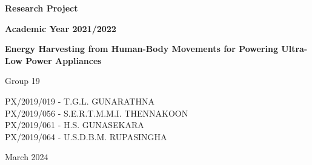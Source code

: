 \documentclass[11pt]{report}	%
\begin{document}
\begin{titlepage}
\LARGE\textbf{Research Project} \\	%

\vspace{0.5cm} 

\large\textbf{Academic Year 2021/2022} 	



\vspace{0.5 cm}	 %
					
\huge\textbf{Energy Harvesting from Human-Body Movements for Powering Ultra-Low Power Appliances} 	%

\vspace{0.5 cm}	%


\vspace{1 cm}
\large{Group 19} %
\vspace{1 cm}	%


\large{
	PX/2019/019 - T.G.L. GUNARATHNA\\[0.15cm] %
	PX/2019/056 - S.E.R.T.M.M.I. THENNAKOON\\[0.15cm]
	PX/2019/061 - H.S. GUNASEKARA\\[0.15cm]
	PX/2019/064 - U.S.D.B.M. RUPASINGHA\\[0.15cm]
}

\vspace{3 cm}

\large{March 2024} 

\vspace*{\fill}	%

\end{titlepage}	%
\end{document}
